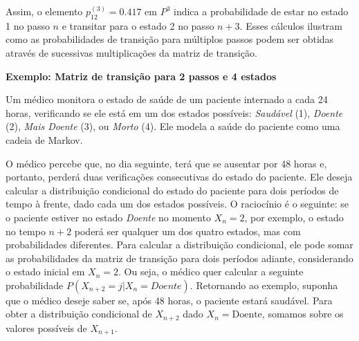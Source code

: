 \documentclass[12pt, a4paper, openany]{book}
\numberwithin{equation}{chapter}
\numberwithin{table}{chapter}
\numberwithin{figure}{chapter}
\theoremstyle{break}
\begin{document}
Assim, o elemento \( p_{12}^{(3)} = 0.417 \) em \( P^3 \) indica a probabilidade de estar no estado 1 no passo \( n \) e transitar para o estado 2 no passo \( n+3 \). Esses cálculos ilustram como as probabilidades de transição para múltiplos passos podem ser obtidas através de sucessivas multiplicações da matriz de transição.







\textbf{Exemplo: Matriz de transição para 2 passos e 4 estados}


Um médico monitora o estado de saúde de um paciente internado a cada 24 horas, verificando se ele está em um dos estados possíveis: \textit{Saudável} (1), \textit{Doente} (2), \textit{Mais Doente} (3), ou \textit{Morto} (4). Ele modela a saúde do paciente como uma cadeia de Markov.


O médico percebe que, no dia seguinte, terá que se ausentar por 48 horas e, portanto, perderá duas verificações consecutivas do estado do paciente. Ele deseja calcular a distribuição condicional do estado do paciente para dois períodos de tempo à frente, dado cada um dos estados possíveis. O raciocínio é o seguinte: se o paciente estiver no estado \textit{Doente} no momento \( X_n = 2 \), por exemplo, o estado no tempo \( n+2 \) poderá ser qualquer um dos quatro estados, mas com probabilidades diferentes. Para calcular a distribuição condicional, ele pode somar as probabilidades da matriz de transição para dois períodos adiante, considerando o estado inicial em \( X_n = 2 \).  Ou seja, o médico quer calcular a seguinte probabilidade $P(X_{n+2} = j |X_{n} = Doente)$.
 Retornando ao exemplo, suponha que o médico deseje saber se, após 48 horas, o paciente estará saudável. Para obter a distribuição condicional de \( X_{n+2} \) dado \( X_n = \text{Doente} \), somamos sobre os valores possíveis de \( X_{n+1} \).


\end{document}
